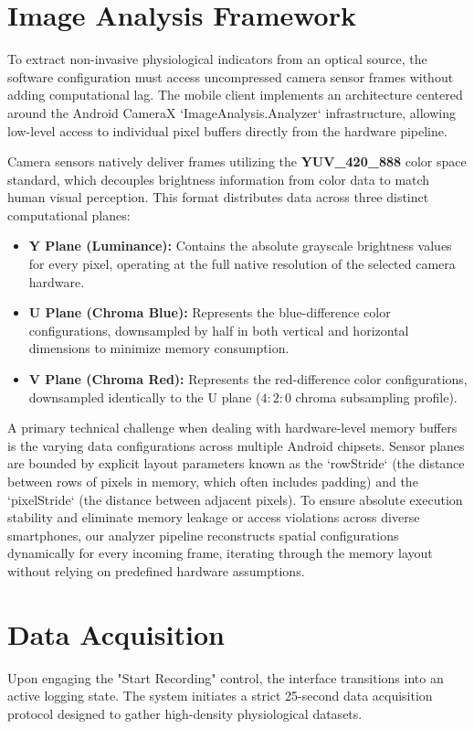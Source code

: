 \section{Image Analysis Framework}
To extract non-invasive physiological indicators from an optical source, the software configuration must access uncompressed camera sensor frames without adding computational lag. The mobile client implements an architecture centered around the Android CameraX `ImageAnalysis.Analyzer` infrastructure, allowing low-level access to individual pixel buffers directly from the hardware pipeline.

Camera sensors natively deliver frames utilizing the \textbf{YUV\_420\_888} color space standard, which decouples brightness information from color data to match human visual perception. This format distributes data across three distinct computational planes:
\begin{itemize}
    \item \textbf{Y Plane (Luminance):} Contains the absolute grayscale brightness values for every pixel, operating at the full native resolution of the selected camera hardware.
    \item \textbf{U Plane (Chroma Blue):} Represents the blue-difference color configurations, downsampled by half in both vertical and horizontal dimensions to minimize memory consumption.
    \item \textbf{V Plane (Chroma Red):} Represents the red-difference color configurations, downsampled identically to the U plane ($4:2:0$ chroma subsampling profile).
\end{itemize}

A primary technical challenge when dealing with hardware-level memory buffers is the varying data configurations across multiple Android chipsets. Sensor planes are bounded by explicit layout parameters known as the `rowStride` (the distance between rows of pixels in memory, which often includes padding) and the `pixelStride` (the distance between adjacent pixels). To ensure absolute execution stability and eliminate memory leakage or access violations across diverse smartphones, our analyzer pipeline reconstructs spatial configurations dynamically for every incoming frame, iterating through the memory layout without relying on predefined hardware assumptions.

\section{Data Acquisition}
Upon engaging the "Start Recording" control, the interface transitions into an active logging state. The system initiates a strict 25-second data acquisition protocol designed to gather high-density physiological datasets.

